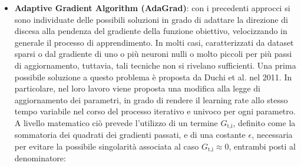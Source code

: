 \begin{itemize}
        A livello concettuale, si può immaginare un passo di aggiornamento effettuato con un momentum optimizer come una somma vettoriale tra il vettore gradiente attuale e il corrispettivo associato alla media di quelli passati. L'approccio proposto da Nestorov, invece, parte dal vettore degli stati passati e usa il gradiente attuale per correggerne la direzione e il modulo. In questo modo si ha la possibilità di applicare una correzione maggiormente consapevole, limitando un'eventuale accelerazione eccessiva e migliorando la reattività del processo. Analogamente a quanto discusso in merito al momentum, per l'impiego nelle moderne reti neurali si predilige un cambio di paradigma che comporta alcune variazioni, pur mantenendo l'equivalenza matematica della formulazione\cite{Momentum_pytorch}:

            \begin{equation}
                \begin{cases}
                    v_{\text{t+1}} = \beta \, v_{\text{t}} + \nabla L(\theta_{\text{t}}) \\[0.35cm]
                    \theta_{\text{t+1}} = \theta_{\text{t}} - \mathrm{\eta} \, \left(\nabla L(\theta_{\text{t}}) + \beta \, v_{\text{t+1}}\right)
                \end{cases}
                \label{eq:nestorov_pytorch}
            \end{equation}

        \item \textbf{Adaptive Gradient Algorithm (AdaGrad)}\cite{AdaGrad_medium}: con i precedenti approcci si sono individuate delle possibili soluzioni in grado di adattare la direzione di discesa alla pendenza del gradiente della funzione obiettivo, velocizzando in generale il processo di apprendimento. In molti casi, caratterizzati da dataset sparsi o dal gradiente di uno o più neuroni nulli o molto piccoli per più passi di aggiornamento, tuttavia, tali tecniche non si rivelano sufficienti. Una prima possibile soluzione a questo problema è proposta da Duchi et al.\cite{AdaGrad} nel 2011. In particolare, nel loro lavoro viene proposta una modifica alla legge di aggiornamento dei parametri, in grado di rendere il learning rate allo stesso tempo variabile nel corso del processo iterativo e univoco per ogni parametro. A livello matematico ciò prevede l'utilizzo di un termine $G_{\text{t,i}}$, definito come la sommatoria dei quadrati dei gradienti passati, e di una costante $\epsilon$, necessaria per evitare la possibile singolarità associata al caso $G_{\text{t,i}} \approx 0$, entrambi posti al denominatore:
        

\end{itemize}
